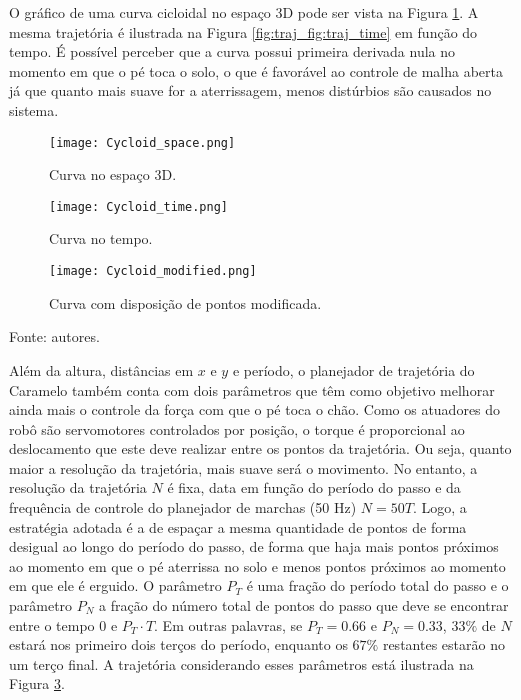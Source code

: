 \documentclass[../main.tex]{subfiles}
\begin{document}
O gráfico de uma curva cicloidal no espaço 3D pode ser vista na Figura \ref{fig:traj_space}. A mesma trajetória é ilustrada na Figura \ref{fig:traj_fig:traj_time} em função do tempo. É possível perceber que a curva possui primeira derivada nula no momento em que o pé toca o solo, o que é favorável ao controle de malha aberta já que quanto mais suave for a aterrissagem, menos distúrbios são causados no sistema. 

\begin{figure*}[h]
  \centering
  \caption{Trajetórias cicloidais para o passo de robô.}
  \begin{subfigure}[t]{0.32\textwidth}
    \centering
    \texttt{[image: Cycloid\_space.png]}
    \caption{Curva no espaço 3D.}
    \label{fig:traj_space}
  \end{subfigure}
  \begin{subfigure}[t]{0.32\textwidth}
    \centering
    \texttt{[image: Cycloid\_time.png]}
    \caption{Curva no tempo.}
    \label{fig:traj_time}
  \end{subfigure}
  \begin{subfigure}[t]{0.32\textwidth}
    \centering
    \texttt{[image: Cycloid\_modified.png]}
    \caption{Curva com disposição de pontos modificada.}
    \label{fig:traj_time_modified}
  \end{subfigure}
  \vfill
  Fonte: autores.
  \label{fig:traj_curve}
\end{figure*}

Além da altura, distâncias em $x$ e $y$ e período, o planejador de trajetória do Caramelo também conta com dois parâmetros que têm como objetivo melhorar ainda mais o controle da força com que o pé toca o chão. Como os atuadores do robô são servomotores controlados por posição, o torque é proporcional ao deslocamento que este deve realizar entre os pontos da trajetória. Ou seja, quanto maior a resolução da trajetória, mais suave será o movimento. No entanto, a resolução da trajetória $N$ é fixa, data em função do período do passo e da frequência de controle do planejador de marchas (50 Hz) $N = 50T$. Logo, a estratégia adotada é a de espaçar a mesma quantidade de pontos de forma desigual ao longo do período do passo, de forma que haja mais pontos próximos ao momento em que o pé aterrissa no solo e menos pontos próximos ao momento em que ele é erguido. O parâmetro $P_T$ é uma fração do período total do passo e o parâmetro $P_N$ a fração do número total de pontos do passo que deve se encontrar entre o tempo $0$ e $P_T \cdot T$. Em outras palavras, se $P_T = 0.66$ e $P_N = 0.33$, $33\%$ de $N$ estará nos primeiro dois terços do período, enquanto os $67\%$ restantes estarão no um terço final. A trajetória considerando esses parâmetros está ilustrada na Figura \ref{fig:traj_time_modified}.


\begin{figure}
  
\end{figure}
\end{document}
